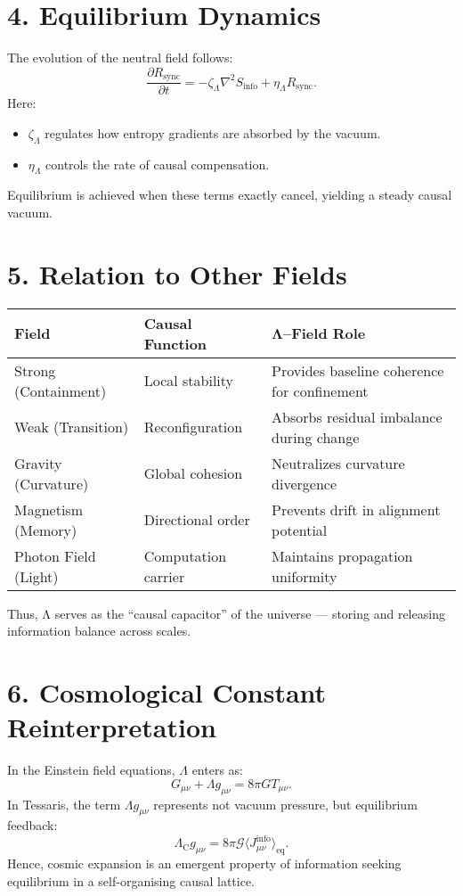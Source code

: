 \documentclass[11pt,a4paper]{article}
\begin{document}
\section{4. Equilibrium Dynamics}
The evolution of the neutral field follows:
\[
\frac{\partial R_{\mathrm{sync}}}{\partial t} = -\zeta_\Lambda \nabla^2 S_{\mathrm{info}} + \eta_\Lambda R_{\mathrm{sync}}.
\]
Here:
\begin{itemize}
\item $\zeta_\Lambda$ regulates how entropy gradients are absorbed by the vacuum.
\item $\eta_\Lambda$ controls the rate of causal compensation.
\end{itemize}
Equilibrium is achieved when these terms exactly cancel, yielding a steady causal vacuum.

\section{5. Relation to Other Fields}
\begin{longtable}{|l|l|l|}
\hline
\textbf{Field} & \textbf{Causal Function} & \textbf{Λ–Field Role} \\
\hline
Strong (Containment) & Local stability & Provides baseline coherence for confinement \\
Weak (Transition) & Reconfiguration & Absorbs residual imbalance during change \\
Gravity (Curvature) & Global cohesion & Neutralizes curvature divergence \\
Magnetism (Memory) & Directional order & Prevents drift in alignment potential \\
Photon Field (Light) & Computation carrier & Maintains propagation uniformity \\
\hline
\end{longtable}

Thus, Λ serves as the “causal capacitor” of the universe — storing and releasing information balance across scales.

\section{6. Cosmological Constant Reinterpretation}
In the Einstein field equations, $\Lambda$ enters as:
\[
G_{\mu\nu} + \Lambda g_{\mu\nu} = 8\pi G T_{\mu\nu}.
\]
In Tessaris, the term $\Lambda g_{\mu\nu}$ represents not vacuum pressure, but equilibrium feedback:
\[
\Lambda_\mathrm{C} g_{\mu\nu} = 8\pi \mathcal{G} \langle J_{\mu\nu}^{\mathrm{info}} \rangle_\mathrm{eq}.
\]
Hence, cosmic expansion is an emergent property of information seeking equilibrium in a self-organising causal lattice.
\end{document}
